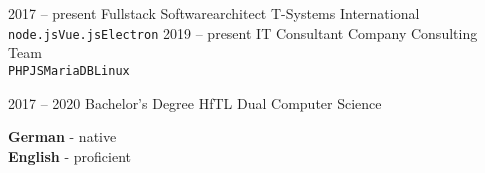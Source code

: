 \documentclass[9pt]{cvstyle}
\begin{document}

\begin{entrylist}
	\entry
		{2017 -- present}
		{Fullstack Softwarearchitect}
		{T-Systems International}
		{\lorem \lorem \lorem\\ \texttt{node.js}\slashsep\texttt{Vue.js}\slashsep\texttt{Electron}}
	\entry
		{2019 -- present}
		{IT Consultant}
		{Company Consulting Team}
		{\lorem\lorem\\ \texttt{PHP}\slashsep\texttt{JS}\slashsep\texttt{MariaDB}\slashsep\texttt{Linux}}
\end{entrylist}


\begin{entrylist}
	\entry
		{2017 -- 2020}
		{Bachelor's Degree}
		{HfTL Dual Computer Science}
		{\lorem\lorem}
\end{entrylist}

\begin{minipage}[t]{0.3\textwidth}
	\vspace{-\baselineskip} 

	
	\textbf{German} - native\\
	\textbf{English} - proficient
\end{minipage}
\hfill
\end{document}
